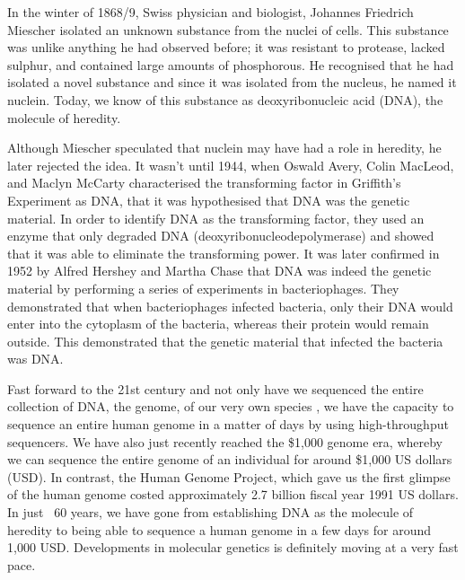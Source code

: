 \setlength{\parskip}{\baselineskip}%
\setlength{\parindent}{0pt}%

In the winter of 1868/9, Swiss physician and biologist, Johannes Friedrich Miescher isolated an unknown substance from the nuclei of cells\cite{dahm2008discovering}. This substance was unlike anything he had observed before; it was resistant to protease, lacked sulphur, and contained large amounts of phosphorous. He recognised that he had isolated a novel substance and since it was isolated from the nucleus, he named it nuclein. Today, we know of this substance as deoxyribonucleic acid (DNA), the molecule of heredity.

Although Miescher speculated that nuclein may have had a role in heredity, he later rejected the idea. It wasn't until 1944, when Oswald Avery, Colin MacLeod, and Maclyn McCarty characterised the transforming factor in Griffith's Experiment\cite{griffith1928significance} as DNA, that it was hypothesised that DNA was the genetic material\cite{avery1944studies}. In order to identify DNA as the transforming factor, they used an enzyme that only degraded DNA (deoxyribonucleodepolymerase) and showed that it was able to eliminate the transforming power. It was later confirmed in 1952 by Alfred Hershey and Martha Chase that DNA was indeed the genetic material by performing a series of experiments in bacteriophages\cite{hershey1952independent}. They demonstrated that when bacteriophages infected bacteria, only their DNA would enter into the cytoplasm of the bacteria, whereas their protein would remain outside. This demonstrated that the genetic material that infected the bacteria was DNA.

Fast forward to the 21st century and not only have we sequenced the entire collection of DNA, the genome, of our very own species \cite{venter2001sequence, lander2001initial}, we have the capacity to sequence an entire human genome in a matter of days by using high-throughput sequencers. We have also just recently reached the \$1,000 genome era, whereby we can sequence the entire genome of an individual for around \$1,000 US dollars (USD). In contrast, the Human Genome Project, which gave us the first glimpse of the human genome costed approximately 2.7 billion fiscal year 1991 US dollars\cite{nhgri2010cost}. In just ~60 years, we have gone from establishing DNA as the molecule of heredity to being able to sequence a human genome in a few days for around 1,000 USD. Developments in molecular genetics is definitely moving at a very fast pace.

